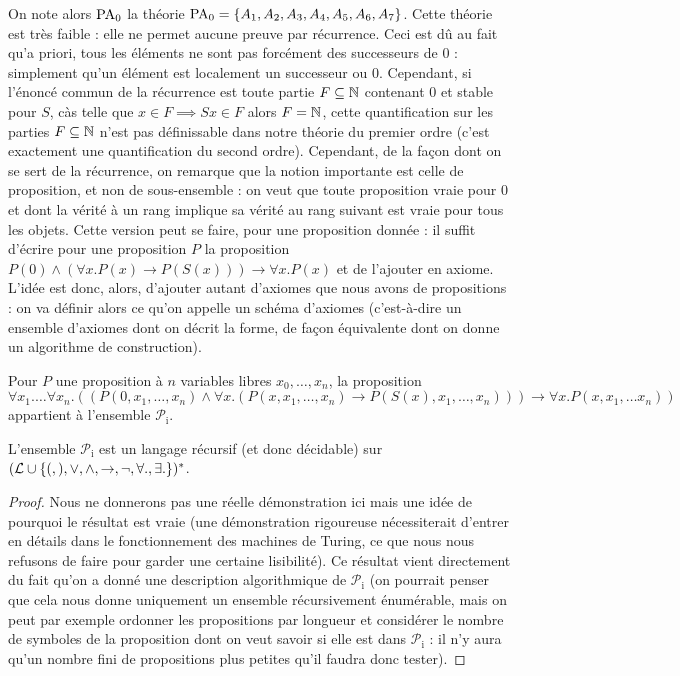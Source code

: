 On note alors $\mathrm{PA}_0$ la théorie $\mathrm{PA}_0 = \{A_1,A_2,A_3,A_4,A_5,A_6,A_7\}$. Cette théorie est très faible : elle ne permet aucune preuve par récurrence. Ceci est dû au fait qu'a priori, tous les éléments ne sont pas forcément des successeurs de $0$ : simplement qu'un élément est localement un successeur ou $0$. Cependant, si l'énoncé commun de la récurrence est \og toute partie $F\subseteq\mathbb{N}$ contenant $0$ et stable pour $S$, càs telle que $x\in F \implies S x \in F$ alors $F=\mathbb{N}$\fg{}, cette quantification sur les parties $F\subseteq\mathbb{N}$ n'est pas définissable dans notre théorie du premier ordre (c'est exactement une quantification du second ordre). Cependant, de la façon dont on se sert de la récurrence, on remarque que la notion importante est celle de proposition, et non de sous-ensemble : on veut que toute proposition vraie pour $0$ et dont la vérité à un rang implique sa vérité au rang suivant est vraie pour tous les objets. Cette version peut se faire, pour une proposition donnée : il suffit d'écrire pour une proposition $P$ la proposition $P(0)\land (\forall x.P(x)\to P(S(x)))\to \forall x. P(x)$ et de l'ajouter en axiome. L'idée est donc, alors, d'ajouter autant d'axiomes que nous avons de propositions : on va définir alors ce qu'on appelle un schéma d'axiomes (c'est-à-dire un ensemble d'axiomes dont on décrit la forme, de façon équivalente dont on donne un algorithme de construction).

\begin{defi}
    Pour $P$ une proposition à $n$ variables libres $x_0,\ldots,x_n$, la proposition $$\forall x_1.\ldots\forall x_n.((P(0,x_1,\ldots,x_n)\land \forall x.(P(x,x_1,\ldots,x_n)\to P(S(x),x_1,\ldots,x_n)))\to \forall x. P(x,x_1,\ldots x_n))$$ appartient à l'ensemble $\mathcal P_\mathrm i$.
\end{defi}

\begin{lem}
    L'ensemble $\mathcal P_\mathrm i$ est un langage récursif (et donc décidable) sur $(\mathcal L\cup\{(,),\lor,\land,\to,\lnot,\forall.,\exists.\})^*$.
\end{lem}

\begin{proof}
    Nous ne donnerons pas une réelle démonstration ici mais une idée de pourquoi le résultat est vraie (une démonstration rigoureuse nécessiterait d'entrer en détails dans le fonctionnement des machines de Turing, ce que nous nous refusons de faire pour garder une certaine lisibilité). Ce résultat vient directement du fait qu'on a donné une description algorithmique de $\mathcal P_\mathrm i$ (on pourrait penser que cela nous donne uniquement un ensemble récursivement énumérable, mais on peut par exemple ordonner les propositions par longueur et considérer le nombre de symboles de la proposition dont on veut savoir si elle est dans $\mathcal P_\mathrm i$ : il n'y aura qu'un nombre fini de propositions plus petites qu'il faudra donc tester).
\end{proof}

